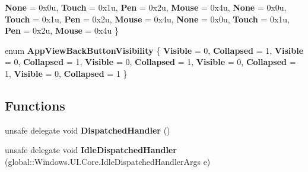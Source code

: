 \begin{DoxyCompactItemize}
{\bfseries None} = 0x0u, 
{\bfseries Touch} = 0x1u, 
{\bfseries Pen} = 0x2u, 
{\bfseries Mouse} = 0x4u, 
\newline
{\bfseries None} = 0x0u, 
{\bfseries Touch} = 0x1u, 
{\bfseries Pen} = 0x2u, 
{\bfseries Mouse} = 0x4u, 
\newline
{\bfseries None} = 0x0u, 
{\bfseries Touch} = 0x1u, 
{\bfseries Pen} = 0x2u, 
{\bfseries Mouse} = 0x4u
 \}
\item 
\mbox{\label{namespace_windows_1_1_u_i_1_1_core_a8126ec99b9eece4bc7dfad594e5fa9a6}} 
enum {\bfseries App\+View\+Back\+Button\+Visibility} \{ \newline
{\bfseries Visible} = 0, 
{\bfseries Collapsed} = 1, 
{\bfseries Visible} = 0, 
{\bfseries Collapsed} = 1, 
\newline
{\bfseries Visible} = 0, 
{\bfseries Collapsed} = 1, 
{\bfseries Visible} = 0, 
{\bfseries Collapsed} = 1, 
\newline
{\bfseries Visible} = 0, 
{\bfseries Collapsed} = 1
 \}
\end{DoxyCompactItemize}
\subsection*{Functions}
\begin{DoxyCompactItemize}
\item 
\mbox{\label{namespace_windows_1_1_u_i_1_1_core_a0b8d0ffb13520d81536fe5c18274f0e0}} 
unsafe delegate void {\bfseries Dispatched\+Handler} ()
\item 
\mbox{\label{namespace_windows_1_1_u_i_1_1_core_a5824a0d38dec91dd62827c6042aa2c56}} 
unsafe delegate void {\bfseries Idle\+Dispatched\+Handler} (global\+::\+Windows.\+U\+I.\+Core.\+Idle\+Dispatched\+Handler\+Args e)
\end{DoxyCompactItemize}
